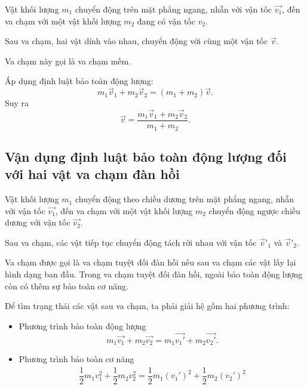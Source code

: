 Vật khối lượng $m_1$ chuyển động trên mặt phẳng ngang, nhẵn với vận tốc $\vec{v_1}$, đến va chạm với một vật khối lượng $m_2$ đang có vận tốc $v_2$. 

Sau va chạm, hai vật dính vào nhau, chuyển động với cùng một vận tốc $\vec{v}$.

Va chạm này gọi là va chạm mềm.

Áp dụng định luật bảo toàn động lượng:
\begin{equation*}
	m_1\vec{v}_1+ m_2\vec{v}_2 = (m_1+m_2)\vec{v}.
\end{equation*}
Suy ra 
\begin{equation*}
	\vec{v}=\dfrac{m_1\vec{v}_1+m_2\vec{v}_2}{m_1+m_2}.
\end{equation*}
\subsection{Vận dụng định luật bảo toàn động lượng đối với hai vật va chạm đàn hồi}

Vật khối lượng $m_1$ chuyển động theo chiều dương trên mặt phẳng ngang, nhẵn với vận tốc $\vec{v_1}$, đến va chạm với một vật khối lượng $m_2$ chuyển động ngược chiều dương với vận tốc $\vec{v_2}$. 

Sau va chạm, các vật tiếp tục chuyển động tách rời nhau với vận tốc $\vec v'_1$ và $\vec v'_2$.

Va chạm được gọi là va chạm tuyệt đối đàn hồi nếu sau va chạm các vật lấy lại hình dạng ban đầu. Trong va chạm tuyệt đối đàn hồi, ngoài bảo toàn động lượng còn có thêm sự bảo toàn cơ năng. 

Để tìm trạng thái các vật sau va chạm, ta phải giải hệ gồm hai phương trình:
\begin{itemize}
	\item Phương trình bảo toàn động lượng 
	\begin{equation*}
		m_1\vec{v_1}+ m_2\vec{v_2} = m_1\vec{v_1'}+m_2\vec{v_2'}.
	\end{equation*}
	\item Phương trình bảo toàn cơ năng 
	\begin{align*}
		\dfrac{1}{2}m_1v_1^2+\dfrac{1}{2}m_2v_2^2=\dfrac{1}{2}m_1(v_1')^2+\dfrac{1}{2}m_2(v_2')^2
	\end{align*}
\end{itemize}

